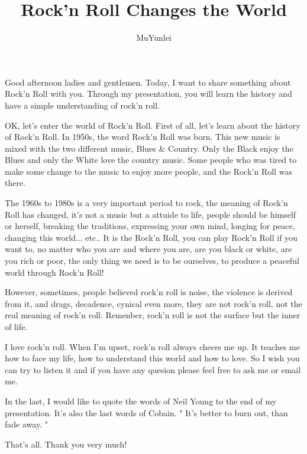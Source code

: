 \documentclass{article}
\title{Rock'n Roll Changes the World}
\author{MuYunlei}
\begin{document}
\maketitle
Good afternoon ladies and gentlemen. Today, I want to share something about Rock'n Roll with you. Through my presentation, you will learn the history and have a simple understanding of rock'n roll. 

OK, let's enter the world of Rock'n Roll. First of all, let's learn about the history of Rock'n Roll. In 1950s, the word Rock'n Roll was born. This new music is mixed with the two different music, Blues \& Country. Only the Black enjoy the Blues and only the White love the country music. Some people who was tired to make some change to the music to enjoy more people, and the Rock'n Roll was there. 

The 1960s to 1980s is a very important period to rock, the meaning of Rock'n Roll has changed, it's not a music but a attuide to life, people should be himself or herself, breaking the traditions, expressing your own mind, longing for peace, changing this world... etc.. It is the Rock'n Roll, you can play Rock'n Roll if you want to, no matter who you are and where you are, are you black or white, are you rich or poor, the only thing we need is to be ourselves, to produce a peaceful world through Rock'n Roll! 

However, sometimes, people believed rock'n roll is noise, the violence is derived from it, and drags, decadence, cynical even more, they are not rock'n roll, not the real meaning of rock'n roll. Remenber, rock'n roll is not the surface but the inner of life.

I love rock'n roll. When I'm upset, rock'n roll always cheers me up. It teaches me how to face my life, how to understand this world and how to love. So I wish you can try to listen it and if you have any quesion please feel free to ask me or email me.

In the last, I would like to quote the words of Neil Young to the end of my presentation. It's also the last words of Cobain. " It's better to burn out, than fade away. " 

That's all. Thank you very much!
\end{document}
